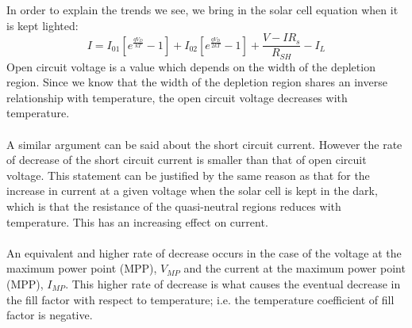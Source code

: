 \documentclass[12pt]{article}
\begin{document}
In order to explain the trends we see, we bring in the solar cell equation when it is kept lighted:
\[ I = I_{01}\left[ e^{\frac{qV_D}{kT}} - 1\right] + I_{02}\left[ e^{\frac{qV_D}{2kT}} - 1\right] + \frac{V-IR_s}{R_{SH}} - I_L\]
Open circuit voltage is a value which depends on the width of the depletion region. Since we know that the width of the depletion region shares an inverse relationship with temperature, the open circuit voltage decreases with temperature.\\\\
A similar argument can be said about the short circuit current. However the rate of decrease of the short circuit current is smaller than that of open circuit voltage. This statement can be justified by the same reason as that for the increase in current at a given voltage when the solar cell is kept in the dark, which is that the resistance of the quasi-neutral regions reduces with temperature. This has an increasing effect on current.\\\\
An equivalent and higher rate of decrease occurs in the case of the voltage at the maximum power point (MPP), \( V_{MP} \) and the current at the maximum power point (MPP), \( I_{MP} \). This higher rate of decrease is what causes the eventual decrease in the fill factor with respect to temperature; i.e. the temperature coefficient of fill factor is negative.
\end{document}

